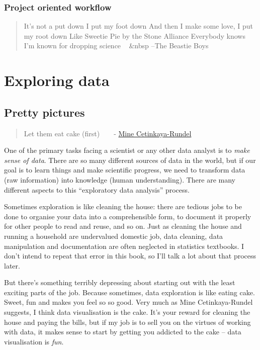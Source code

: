 \documentclass[]{book}
\begin{document}
\hypertarget{project-oriented-workflow}{%
\section{Project oriented workflow}\label{project-oriented-workflow}}

\begin{quote}
It's not a put down
I put my foot down
And then I make some love, I put my root down
Like Sweetie Pie by the Stone Alliance
Everybody knows I'm known for dropping science
~ \&nbsp --The Beastie Boys
\end{quote}

\hypertarget{part-exploring-data}{%
\part{Exploring data}\label{part-exploring-data}}

\hypertarget{datavis}{%
\chapter{Pretty pictures}\label{datavis}}

\begin{quote}
Let them eat cake (first)
~ ~ - \href{https://speakerdeck.com/minecr/let-them-eat-cake-first}{Mine Cetinkaya-Rundel}
\end{quote}

One of the primary tasks facing a scientist or any other data analyst is to \emph{make sense of data}. There are so many different sources of data in the world, but if our goal is to learn things and make scientific progress, we need to transform data (raw information) into knowledge (human understanding). There are many different aspects to this ``exploratory data analysis'' process.

Sometimes exploration is like cleaning the house: there are tedious jobs to be done to organise your data into a comprehensible form, to document it properly for other people to read and reuse, and so on. Just as cleaning the house and running a household are undervalued domestic job, data cleaning, data manipulation and documentation are often neglected in statistics textbooks. I don't intend to repeat that error in this book, so I'll talk a lot about that process later.

But there's something terribly depressing about starting out with the least exciting parts of the job. Because sometimes, data exploration is like eating cake. Sweet, fun and makes you feel so so good. Very much as Mine Cetinkaya-Rundel suggests, I think data visualisation is the cake. It's your reward for cleaning the house and paying the bills, but if my job is to sell you on the virtues of working with data, it makes sense to start by getting you addicted to the cake -- data visualisation is \emph{fun}.
\end{document}
